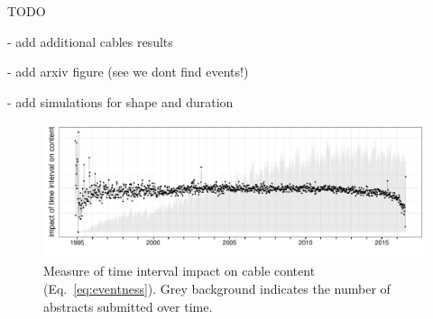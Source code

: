 
TODO

- add additional cables results 

- add arxiv figure (see we dont find events!)

- add simulations for shape and duration



\begin{figure}[ht]
\centering
\includegraphics[width=\linewidth]{fig/arxiv_events.pdf}
\caption{Measure of time interval impact on cable content (Eq.~\ref{eq:eventness}).  Grey background indicates the number of abstracts submitted over time.}
\label{fig:arxiv_events}
\end{figure}